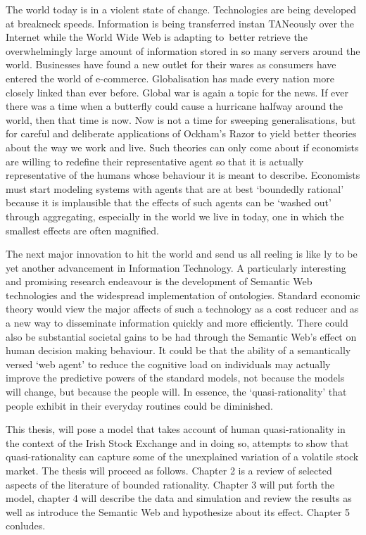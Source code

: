 \documentclass{ucthesis}
\begin{document}
The world today is in a violent state of change. Technologies are being
developed at breakneck speeds. Information is being transferred instan%
{\LARGE TAN}eously over the Internet while the World Wide Web is adapting
to\ better retrieve the overwhelmingly large amount of information stored in
so many servers around the world. Businesses have found a new outlet for
their wares as consumers have entered the world of e-commerce. Globalisation
has made every nation more closely linked than ever before. Global war is
again a topic for the news. If ever there was a time when a butterfly could
cause a hurricane halfway around the world, then that time is now. Now is
not a time for sweeping generalisations, but for careful and deliberate
applications of Ockham's Razor to yield better theories about the way we
work and live. Such theories can only come about if economists are willing
to redefine their representative agent so that it is actually representative
of the humans whose behaviour it is meant to describe. Economists must start
modeling systems with agents that are at best `boundedly rational' because
it is implausible that the effects of such agents can be `washed out'
through aggregating, especially in the world we live in today, one in which
the smallest effects are often magnified.

The next major innovation to hit the world and send us all reeling is like%
{\LARGE ly} to be yet another advancement in Information Technology. A
particularly interesting and promising research endeavour is the development
of Semantic Web technologies and the widespread implementation of
ontologies. Standard economic theory would view the major affects of such a
technology as a cost reducer and as a new way to disseminate information
quickly and more efficiently. There could also be substantial societal gains
to be had through the Semantic Web's effect on human decision making
behaviour. It could be that the ability of a semantically versed `web agent'
to reduce the cognitive load on individuals may actually improve the
predictive powers of the standard models, not because the models will
change, but because the people will. In essence, the `quasi-rationality'
that people exhibit in their everyday routines could be diminished.

This thesis, will pose a model that takes account of human quasi-rationality
in the context of the Irish Stock Exchange and in doing so, attempts to show
that quasi-rationality can capture some of the unexplained variation of a
volatile stock market. The thesis will proceed as follows. Chapter 2 is a
review of {\LARGE selected aspects of }the literature of bounded
rationality. Chapter 3 will put forth the model, chapter 4 will describe the
data and simulation and review the results as well as introduce the Semantic
Web and hypothesize about its effect. Chapter 5 conludes.
\end{document}
